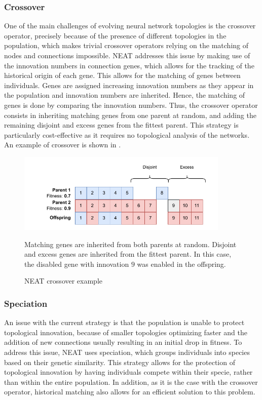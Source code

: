 \subsubsection{Crossover}

One of the main challenges of evolving neural network topologies is the crossover operator, precisely because of the presence of different topologies in the population,
which makes trivial crossover operators relying on the matching of nodes and connections impossible.
NEAT addresses this issue by making use of the innovation numbers in connection genes, which allows for the tracking of the historical origin of each gene. This allows
for the matching of genes between individuals. Genes are assigned increasing innovation numbers as they appear in the population and innovation numbers are inherited.
Hence, the matching of genes is done by comparing the innovation numbers. Thus, the crossover operator consists in inheriting matching genes from one parent at random,
and adding the remaining disjoint and excess genes from the fittest parent. This strategy is particularly cost-effective as it requires no topological analysis of the networks.
An example of crossover is shown in .

\begin{figure}
    \centering
    \includegraphics[width=0.9\textwidth]{Pictures/neat_crossover}
    \caption{NEAT crossover example}{Matching genes are inherited from both parents at random. Disjoint and excess genes are inherited from the fittest parent. In this case, the
    disabled gene with innovation $9$ was enabled in the offspring.}
    \label{fig:neat_crossover}
\end{figure}

\subsubsection{Speciation}

An issue with the current strategy is that the population is unable to protect topological innovation, because of smaller topologies optimizing faster and the
addition of new connections usually resulting in an initial drop in fitness. To address this issue, NEAT uses speciation, which groups individuals into species based
on their genetic similarity. This strategy allows for the protection of topological innovation by having individuals compete within their specie, rather than within the
entire population. In addition, as it is the case with the crossover operator, historical matching also allows for an efficient solution to this problem.

